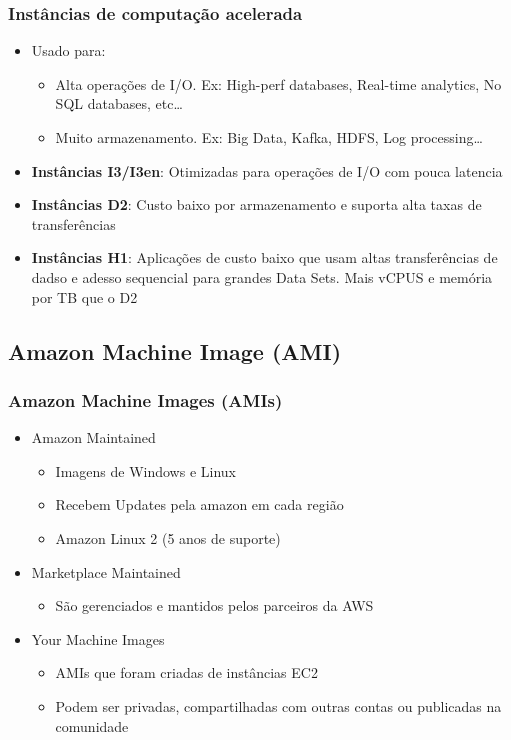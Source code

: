 \begin{frame}
	\frametitle{Instâncias de computação acelerada}
	\begin{itemize}
		\item Usado para:
			\begin{itemize}
				\item Alta operações de I/O. Ex: High-perf databases, Real-time analytics, No SQL databases, etc\dots
				\item Muito armazenamento. Ex: Big Data, Kafka, HDFS, Log processing\dots
			\end{itemize}
		\item \textbf{Instâncias I3/I3en}: Otimizadas para operações de I/O com pouca latencia
		\item \textbf{Instâncias D2}: Custo baixo por armazenamento e suporta alta taxas de transferências
		\item \textbf{Instâncias H1}: Aplicações de custo baixo que usam altas transferências de dadso e adesso sequencial para grandes Data Sets. Mais vCPUS e memória por TB que o D2
	\end{itemize}
\end{frame}

\subsection{Amazon Machine Image (AMI)}

\begin{frame}
	\frametitle{Amazon Machine Images (AMIs)}
	\begin{itemize}
		\item Amazon Maintained
			\begin{itemize}
				\item Imagens de Windows e Linux
				\item Recebem Updates pela amazon em cada região
				\item Amazon Linux 2 (5 anos de suporte)
			\end{itemize}
		\item Marketplace Maintained
			\begin{itemize}
				\item São gerenciados e mantidos pelos parceiros da AWS
			\end{itemize}
		\item Your Machine Images
			\begin{itemize}
				\item AMIs que foram criadas de instâncias EC2
				\item Podem ser privadas, compartilhadas com outras contas ou publicadas na comunidade
			\end{itemize}
	\end{itemize}
\end{frame}

